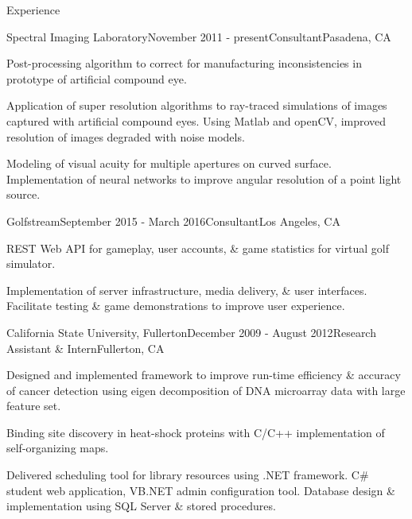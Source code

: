 \documentclass{resume} %
\begin{document}
\begin{rSection}{Experience}
\begin{rSubsection}{Spectral Imaging Laboratory}{November 2011 - present}{Consultant}{Pasadena, CA}
\item Post-processing algorithm to correct for manufacturing inconsistencies in prototype of artificial compound eye.
\item Application of super resolution algorithms to ray-traced simulations of images captured with artificial compound eyes. Using Matlab and openCV, improved resolution of images degraded with noise models.
\item Modeling of visual acuity for multiple apertures on curved surface. Implementation of neural networks to improve angular resolution of a point light source. 
\end{rSubsection}



\begin{rSubsection}{Golfstream}{September 2015 - March 2016}{Consultant}{Los Angeles, CA}
\item REST Web API for gameplay, user accounts, \& game statistics for virtual golf simulator. 
\item Implementation of server infrastructure, media delivery, \& user interfaces. Facilitate testing \& game demonstrations to improve user experience.
\end{rSubsection}


\begin{rSubsection}{California State University, Fullerton}{December 2009 - August 2012}{Research Assistant \& Intern}{Fullerton, CA}
\item Designed and implemented framework to improve run-time efficiency \& accuracy of cancer detection using eigen decomposition of DNA microarray data with large feature set.
\item Binding site discovery in heat-shock proteins with C/C++ implementation of self-organizing maps.
\item Delivered scheduling tool for library resources using .NET framework. C\# student web application, VB.NET admin configuration tool. Database design \& implementation using SQL Server \& stored procedures.
\end{rSubsection}

\end{rSection}

\end{document}
